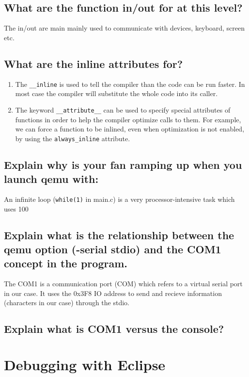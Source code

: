 \documentclass[10]{article}
\begin{document}
\subsection{What are the function in/out for at this level?}
The in/out are main mainly used to communicate with devices, keyboard, screen  etc.
\subsection{What are the inline attributes for?}
\begin{enumerate}
 	\item
 	The \texttt{\_\_inline} is used to tell the compiler than the code  can be run faster. In most case the compiler will substitute the whole code into its caller.
 	\item
 	The keyword \texttt{\_\_attribute\_\_} can be used to specify special attributes of functions in order to help the compiler optimize calls to them. For example, we can force a function to be inlined, even when optimization is not enabled, by using the \texttt{always\_inline} attribute.


 	
\end{enumerate}
\subsection{Explain why is your fan ramping up when you launch qemu with:}
An infinite loop (\texttt{while(1)} in main.c) is a very processor-intensive task which uses 100%

\subsection{Explain what is the relationship between the qemu option (-serial stdio) and the COM1 concept in the program.}

The COM1 is a communication port (COM) which refers to a virtual serial port in our case. It uses the 0x3F8 I\/O address to send and recieve information (characters in our case) through the stdio.
\subsection{Explain what is COM1 versus the console?}

\section{Debugging with Eclipse}
\end{document}
